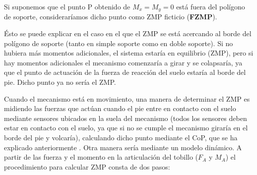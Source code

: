 Si suponemos que el punto P obtenido de $M_x=M_y=0$ está fuera del polígono de soporte, consideraríamos dicho punto como ZMP ficticio (\textbf{FZMP}). 

Ésto se puede explicar en el caso en el que el ZMP se está acercando al borde del polígono de soporte (tanto en simple soporte como en doble soporte). Si no hubiera más momentos adicionales, el sistema estaría en equilibrio (ZMP), pero si hay momentos adicionales el mecanismo comenzaría a girar y se colapsaría, ya que el punto de actuación de la fuerza de reacción del suelo estaría al borde del pie. Dicho punto ya no sería el ZMP.

Cuando el mecanismo está en movimiento, una manera de determinar el ZMP es midiendo las fuerzas que actúan cuando el pie entre en contacto con el suelo mediante sensores ubicados en la suela del mecanismo (todos los sensores deben estar en contacto con el suelo, ya que si no se cumple el mecanismo giraría en el borde del pie y volcaría), calculando dicho punto mediante el CoP, que se ha explicado anteriormente . Otra manera sería mediante un modelo dinámico. A partir de las fuerza y el momento en la articulación del tobillo ($F_A$ y $M_A$) el procedimiento para calcular ZMP consta de dos pasos:

